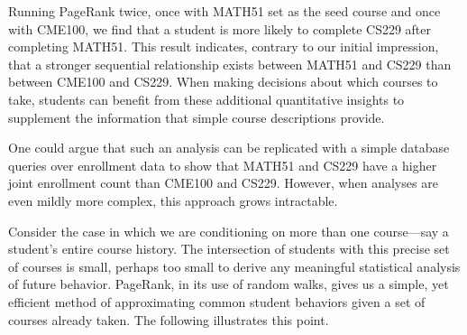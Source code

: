 Running PageRank twice, once with MATH51 set as the seed course and
once with CME100, we find that a student is more likely to complete
CS229 after completing MATH51. This result indicates, contrary to our
initial impression, that a stronger sequential relationship exists
between MATH51 and CS229 than between CME100 and CS229. When making
decisions about which courses to take, students can benefit from these
additional quantitative insights to supplement the information that
simple course descriptions provide.

One could argue that such an analysis can be replicated with a simple
database queries over enrollment data to show that MATH51 and CS229
have a higher joint enrollment count than CME100 and CS229. However,
when analyses are even mildly more complex, this approach grows
intractable.

Consider the case in which we are conditioning on more than
one course---say a student's entire course history. The intersection
of students with this precise set of courses is small, perhaps too
small to derive any meaningful statistical analysis of future
behavior. PageRank, in its use of random walks, gives us a simple, yet
efficient method of approximating common student behaviors given a set
of courses already taken. The following illustrates this point.

